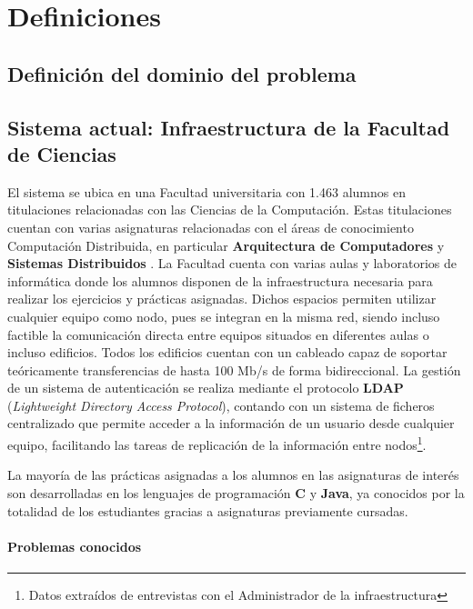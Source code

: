 \section{Definiciones}

\subsection{Definición del dominio del problema}


\subsection{Sistema actual: Infraestructura de la Facultad de Ciencias}
\label{dominioproblema:infraestructura}
El sistema se ubica en una Facultad universitaria con 1.463 alumnos\cite{uecusal:estudiantes} en titulaciones relacionadas con las Ciencias de la Computación. Estas titulaciones cuentan con varias asignaturas relacionadas con el áreas de conocimiento Computación Distribuida, en particular \textbf{Arquitectura de Computadores} y \textbf{Sistemas Distribuidos} \cite{DIA15GuiaAcademica}. La Facultad cuenta con varias aulas y laboratorios de informática donde los alumnos disponen de la infraestructura necesaria para realizar los ejercicios y prácticas asignadas. Dichos espacios permiten utilizar cualquier equipo como nodo, pues se integran en la misma red, siendo incluso factible la comunicación directa entre equipos situados en diferentes aulas o incluso edificios. Todos los edificios cuentan con un cableado capaz de soportar teóricamente transferencias de hasta 100 Mb/s de forma bidireccional. La gestión de un sistema de autenticación se realiza mediante el protocolo \textbf{LDAP} (\textit{Lightweight Directory Access Protocol})\cite{RFC4516-comment}, contando con un sistema de ficheros centralizado que permite acceder a la información de un usuario desde cualquier equipo, facilitando las tareas de replicación de la información entre nodos\footnote{Datos extraídos de entrevistas con el Administrador de la infraestructura}.

La mayoría de las prácticas asignadas a los alumnos en las asignaturas de interés son desarrolladas en los lenguajes de programación \textbf{C} y \textbf{Java}, ya conocidos por la totalidad de los estudiantes gracias a asignaturas previamente cursadas.

\paragraph{Problemas conocidos}


